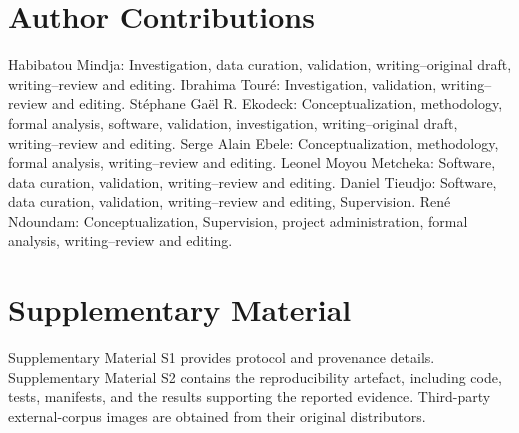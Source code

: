 \documentclass[preprint,12pt]{elsarticle}
\theoremstyle{plain}
\begin{document}
\section*{Author Contributions}
Habibatou Mindja: Investigation, data curation, validation, writing--original draft, writing--review and editing. Ibrahima Tour\'e: Investigation, validation, writing--review and editing. St\'ephane Ga\"el R. Ekodeck: Conceptualization, methodology, formal analysis, software, validation, investigation, writing--original draft, writing--review and editing. Serge Alain Ebele: Conceptualization, methodology, formal analysis, writing--review and editing. Leonel Moyou Metcheka: Software, data curation, validation, writing--review and editing. Daniel Tieudjo: Software, data curation, validation, writing--review and editing, Supervision. Ren\'e Ndoundam: Conceptualization, Supervision, project administration, formal analysis, writing--review and editing.
\section*{Supplementary Material}
Supplementary Material S1 provides protocol and provenance details. Supplementary Material S2 contains the reproducibility artefact, including code, tests, manifests, and the results supporting the reported evidence. Third-party external-corpus images are obtained from their original distributors.
\end{document}
